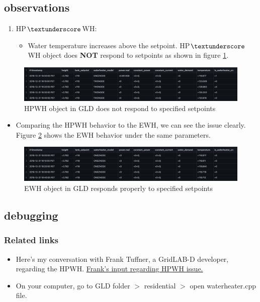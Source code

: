 \subsection{observations}
    \begin{enumerate}
        \item HP$\textunderscore$WH:
        \begin{itemize}
            \item Water temperature increases above the setpoint. HP$\textunderscore$WH object does \textbf{NOT} respond to setpoints as shown in figure \ref{fig:HPWH}.
    \end{itemize}
    \end{enumerate}
    \begin{figure}[htp!]
        \centering
        \includegraphics[width=1.1\columnwidth]{Pictures/HPWH_wrong_behavior.png}
        \caption{HPWH object in GLD does not respond to specified setpoints}
        \label{fig:HPWH}
    \end{figure}
    \begin{itemize}
        \item Comparing the HPWH behavior to the EWH, we can see the issue clearly. Figure \ref{fig:EWH} shows the EWH behavior under the same parameters.
    \end{itemize}
    \begin{figure}[htp!]
        \centering
        \includegraphics[width=1.1\columnwidth]{Pictures/EWH.png}
        \caption{EWH object in GLD responds properly to specified setpoints}
        \label{fig:EWH}
    \end{figure}
\newpage
    
\subsection{debugging}
\subsubsection{Related links}
\begin{itemize}
    \item Here's my conversation with Frank Tuffner, a GridLAB-D developer, regarding the HPWH. \href{https://sourceforge.net/p/gridlab-d/discussion/842562/thread/4a543d83a0/?limit=25#71e9}{Frank's input regarding HPWH issue.}
    \item On your computer, go to GLD folder $>$ residential $>$ open waterheater.cpp file.
\end{itemize}
